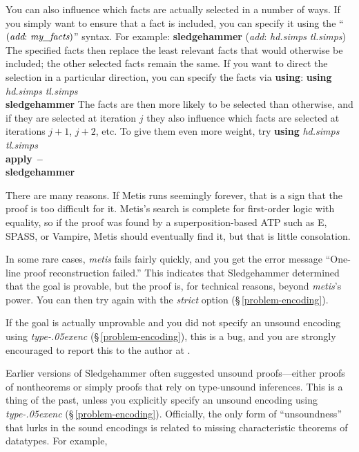 \documentclass[a4paper,12pt]{article}
\let\oldS=\S
\def\S{\oldS\,}
\renewcommand\_{\hbox{\textunderscore\kern-.05ex}}
\begin{document}
You can also influence which facts are actually selected in a number of ways. If
you simply want to ensure that a fact is included, you can specify it using the
``$(\textit{add}{:}~\textit{my\_facts})$'' syntax. For example:
%
\prew
\textbf{sledgehammer} (\textit{add}: \textit{hd.simps} \textit{tl.simps})
\postw
%
The specified facts then replace the least relevant facts that would otherwise be
included; the other selected facts remain the same.
If you want to direct the selection in a particular direction, you can specify
the facts via \textbf{using}:
%
\prew
\textbf{using} \textit{hd.simps} \textit{tl.simps} \\
\textbf{sledgehammer}
\postw
%
The facts are then more likely to be selected than otherwise, and if they are
selected at iteration $j$ they also influence which facts are selected at
iterations $j + 1$, $j + 2$, etc. To give them even more weight, try
%
\prew
\textbf{using} \textit{hd.simps} \textit{tl.simps} \\
\textbf{apply}~\textbf{--} \\
\textbf{sledgehammer}
\postw



There are many reasons. If Metis runs seemingly forever, that is a sign that the
proof is too difficult for it. Metis's search is complete for first-order logic
with equality, so if the proof was found by a superposition-based ATP such as
E, SPASS, or Vampire, Metis should eventually find it, but that is little
consolation.

In some rare cases, \textit{metis} fails fairly quickly, and you get the error
message ``One-line proof reconstruction failed.'' This indicates that
Sledgehammer determined that the goal is provable, but the proof is, for
technical reasons, beyond \textit{metis}'s power. You can then try again with
the \textit{strict} option (\S\ref{problem-encoding}).

If the goal is actually unprovable and you did not specify an unsound encoding
using \textit{type\_enc} (\S\ref{problem-encoding}), this is a bug, and you are
strongly encouraged to report this to the author at \authoremail.



Earlier versions of Sledgehammer often suggested unsound proofs---either proofs
of nontheorems or simply proofs that rely on type-unsound inferences. This
is a thing of the past, unless you explicitly specify an unsound encoding
using \textit{type\_enc} (\S\ref{problem-encoding}).
%
Officially, the only form of ``unsoundness'' that lurks in the sound
encodings is related to missing characteristic theorems of datatypes. For
example,
\end{document}
